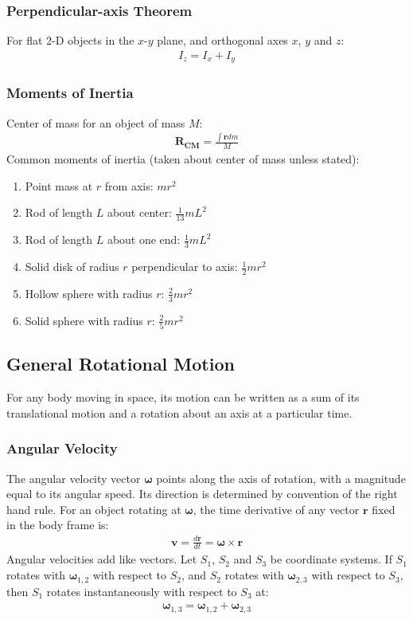 \documentclass[11pt, letterpaper]{article}
\newcommand{\ve}[1]{
  \ensuremath{\bm{#1}}}	               %
\begin{document}
\begin{multicols*}{3}
\subsubsection{Perpendicular-axis Theorem}
For flat 2-D objects in the $x$-$y$ plane, and orthogonal axes $x$, $y$ and $z$:
\begin{align*}
  I_z=I_x+I_y
\end{align*}
\subsubsection{Moments of Inertia}
Center of mass for an object of mass $M$:
\begin{align*}
  \ve{R_\text{CM}}=\frac{\int\ve{r}dm}{M}
\end{align*}
Common moments of inertia (taken about center of mass unless stated):
\begin{enumerate}
  \setlength{\itemsep}{2mm}
\item Point mass at $r$ from axis: $mr^2$
\item Rod of length $L$ about center: $\frac{1}{13}mL^2$
\item Rod of length $L$ about one end: $\frac{1}{3}mL^2$
\item Solid disk of radius $r$ perpendicular to axis: $\frac{1}{2}mr^2$
\item Hollow sphere with radius $r$: $\frac{2}{3}mr^2$
\item Solid sphere with radius $r$: $\frac{2}{5}mr^2$
\end{enumerate}
\subsection{General Rotational Motion}
For any body moving in space, its motion can be written as a sum of its
translational motion and a rotation about an axis at a particular time.
\subsubsection{Angular Velocity}
The angular velocity vector $\ve{\omega}$ points along the axis of rotation,
with a magnitude equal to its angular speed. Its direction is determined by
convention of the right hand rule. For an object rotating at $\ve{\omega}$, the
time derivative of any vector $\ve{r}$ fixed in the body frame is:
\begin{align*}
  \ve{v} = \frac{d\ve{r}}{dt} = \ve{\omega} \times \ve{r}
\end{align*}
Angular velocities add like vectors. Let $S_1$, $S_2$ and $S_3$ be coordinate
systems. If $S_1$ rotates with $\ve{\omega}_{1, 2}$ with respect to $S_2$, and
$S_2$ rotates with $\ve{\omega}_{2, 3}$ with respect to $S_3$, then $S_1$
rotates instantaneously with respect to $S_3$ at:
\begin{align*}
  \ve{\omega}_{1, 3} = \ve{\omega}_{1, 2} + \ve{\omega}_{2, 3}
\end{align*}

\end{multicols*}
\end{document}
